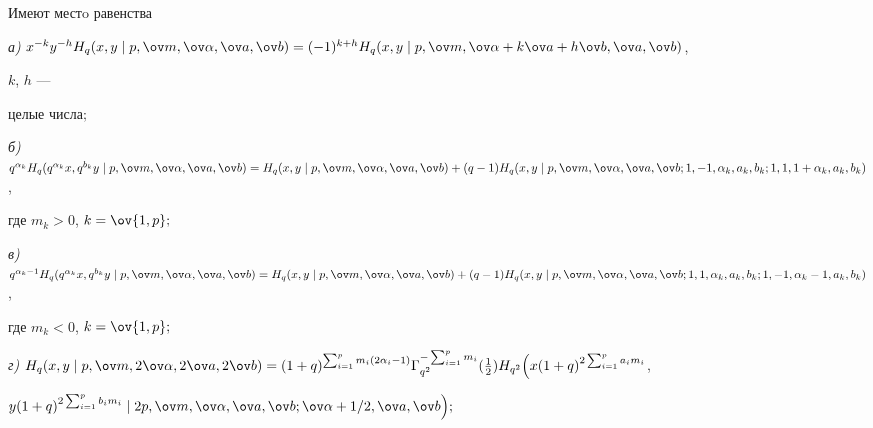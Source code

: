 \begin{thms} 


Имеют местo равенства 


 


{\em а)} $x^{-k}y^{-h}H_q(x,y\mid p,\ov m,\ov\alpha,\ov a,\ov 


b)=(-1)^{k+h}H_q(x,y\mid p,\ov m,\ov\alpha+k\ov a+h\ov b,\ov a,\ov b)$, 


$k$, $h$ --- 


целые числа$;$ 


 


{\em б)} $q^{\alpha_k}H_q(q^{\alpha_k}x,q^{b_k}y\mid 


p,\ov m,\ov\alpha,\ov a,\ov b)= 


H_q(x,y\mid p,\ov m,\ov\alpha,\ov a,\ov b)+(q-1)H_q(x,y\mid 


p,\ov m,\ov\alpha,\ov a,\ov b; \linebreak


1,-1,\alpha_k,a_k,b_k; 1,1,1+\alpha_k,a_k,b_k)$, 


где $m_k>0$, $k=\ov{1,p};$ 


 


{\em в)} $q^{\alpha_k-1}H_q(q^{\alpha_k}x,q^{b_k}y\mid 


p,\ov m,\ov\alpha,\ov a,\ov b)=H_q(x,y\mid 


p,\ov m,\ov\alpha,\ov a,\ov b)+(q-1)H_q(x,y\mid 


p,\ov m,\ov\alpha,\ov a,\ov b;\linebreak 1,1,\alpha_k,a_k,b_k;


1,-1,\alpha_k-1, a_k,b_k)$, 


где $m_k<0$, $k=\ov{1,p};$ 


 


{\em г)} $H_q(x,y\mid p,\ov m,2\ov\alpha,2\ov a,2\ov b)


=(1+q)^{\sum^p_{i=1}m_i(2\alpha_i-1)} 


\Gamma_{q^2}^{-\sum^p_{i=1}m_i}(\frac{1}{2}) 


H_{q^2}\Big(x(1+q)^{2\sum^p_{i=1}a_i m_i}$,





\hspace{8cm}$y(1+q)^{2\sum^p_{i=1}b_i m_i}\mid 


2p,\ov m,\ov\alpha,\ov a,\ov b;\ov\alpha+1/2,\ov a,\ov b\Big);$ 



\end{thms}
